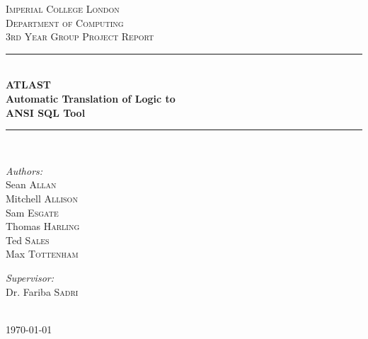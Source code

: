 \documentclass[a4paper, 11pt]{article}
\begin{document}
\begin{titlepage}

\newcommand{\HRule}{\rule{\linewidth}{0.5mm}} %

\center

\vspace*{2cm}
\textsc{\LARGE Imperial College London}\\[1.5cm]
\textsc{\Large Department of Computing}\\[0.5cm]
\textsc{\large 3rd Year Group Project Report}\\[0.5cm]

\HRule \\[0.4cm]
{\huge \bfseries ATLAST}\\[0.6cm]
{\huge \bfseries Automatic Translation of Logic to}\\[0.2cm]
{\huge \bfseries ANSI SQL Tool}\\[0.4cm]%
\HRule \\[1.5cm]


\begin{minipage}[t]{0.4\textwidth}
  \begin{flushleft} \large
    \emph{Authors:}\\
    Sean \textsc{Allan}\\
    Mitchell \textsc{Allison}\\
    Sam \textsc{Esgate}\\
    Thomas \textsc{Harling}\\
    Ted \textsc{Sales}\\
    Max \textsc{Tottenham}
  \end{flushleft}
\end{minipage}%
%
\begin{minipage}[t]{0.4\textwidth}
  \begin{flushright} \large
    \emph{Supervisor:} \\
    Dr. Fariba \textsc{Sadri}  %
  \end{flushright}
\end{minipage}%
\\[4cm]

{\large \today}\\[3cm] %

\vfill %

\end{titlepage}
\end{document}
